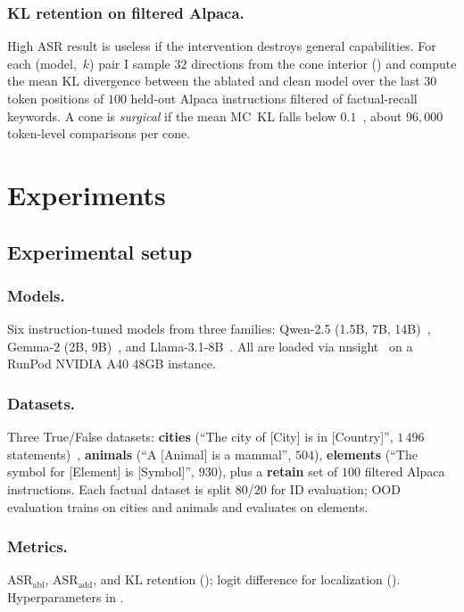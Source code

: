 \documentclass[sn-basic]{sn-jnl}
\begin{document}
\subsubsection*{KL retention on filtered Alpaca.}
High ASR result is useless if the intervention destroys general capabilities.
For each (model,~$k$) pair I sample $32$ directions from the cone interior
() and compute the mean KL divergence between the ablated and
clean model over the last $30$ token positions of $100$ held-out Alpaca
instructions filtered of factual-recall keywords. A cone is \emph{surgical} if
the mean MC~KL falls below $0.1$~\citep{arditiRefusalLanguageModels2024}, about
$96{,}000$ token-level comparisons per cone.

\section{Experiments}
\label{sec:exp}



\subsection{Experimental setup}
\label{sec:setup}
\subsubsection*{Models.}
Six instruction-tuned models from three families: Qwen-2.5 (1.5B, 7B,
14B)~\cite{yang2024qwen25}, Gemma-2 (2B, 9B)~\cite{gemmateam2024gemma2}, and
Llama-3.1-8B~\cite{grattafiori2024llama3}. All are loaded via
nnsight~\cite{fiotto-kaufmanNNsightNDIFDemocratizing2025} on a RunPod NVIDIA A40
48GB instance.
\subsubsection*{Datasets.}
Three True/False datasets: \textbf{cities} (``The city of [City]
is in [Country]'', $1\,496$ statements)~\cite{marksGeometryTruthEmergent2024},
\textbf{animals} (``A [Animal] is a mammal'', $504$), \textbf{elements} (``The
symbol for [Element] is [Symbol]'', $930$), plus a \textbf{retain} set of $100$
filtered Alpaca instructions. Each factual dataset is split $80$/$20$ for ID
evaluation; OOD evaluation trains on cities and animals and evaluates on
elements.
\subsubsection*{Metrics.}
$\mathrm{ASR}_{\text{abl}}$, $\mathrm{ASR}_{\text{add}}$, and KL retention
(); logit difference for localization ().
Hyperparameters in .
\end{document}
